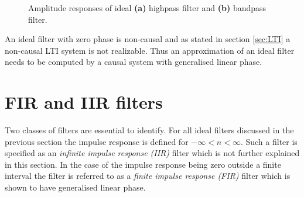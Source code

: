 \begin{figure}[H]
\begin{subfigure}[b]{0.50\textwidth}
        \centering
{}

\caption{}
    \end{subfigure}
 \begin{subfigure}[b]{0.50\textwidth}
        \centering  
{}
\caption{}
    \end{subfigure}
\caption{Amplitude responses of ideal \textbf{(a)} highpass filter and \textbf{(b)} bandpass filter.}
\label{fig:ideal}
\end{figure}


An ideal filter with zero phase is non-causal and as stated in section \ref{sec:LTI} a non-causal LTI system is not realizable. Thus an approximation of an ideal filter needs to be computed by a causal system with generalised linear phase.

\section{FIR and IIR filters} \label{sec:FIR_IIR}
Two classes of filters are essential to identify. For all ideal filters discussed in the previous section the impulse response is defined for $-\infty < n < \infty$. Such a filter is specified as an \textit{infinite impulse response (IIR)} filter which is not further explained in this section. In the case of the impulse response being zero outside a finite interval the filter is referred to as a \textit{finite impulse response (FIR)} filter which is shown to have generalised linear phase.

